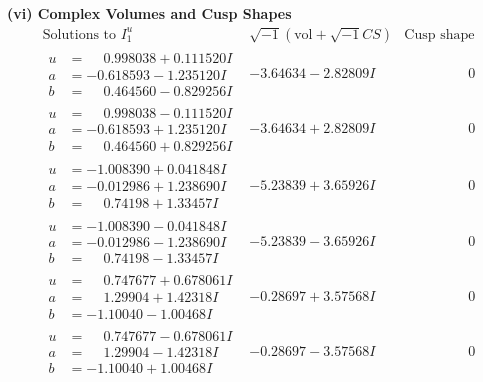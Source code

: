 \documentclass[1p]{elsarticle_modified}
\theoremstyle{definition}
\newcommand{\I}{\sqrt{-1}}
\begin{document}
\newpage\flushleft \textbf{(vi) Complex Volumes and Cusp Shapes}
$$\begin{array}{c|c|c}  
\text{Solutions to }I^u_{1}& \I (\text{vol} + \sqrt{-1}CS) & \text{Cusp shape}\\
 \hline 
\begin{aligned}
u &= \phantom{-}0.998038 + 0.111520 I \\
a &= -0.618593 - 1.235120 I \\
b &= \phantom{-}0.464560 - 0.829256 I\end{aligned}
 & -3.64634 - 2.82809 I & \phantom{-0.000000 } 0 \\ \hline\begin{aligned}
u &= \phantom{-}0.998038 - 0.111520 I \\
a &= -0.618593 + 1.235120 I \\
b &= \phantom{-}0.464560 + 0.829256 I\end{aligned}
 & -3.64634 + 2.82809 I & \phantom{-0.000000 } 0 \\ \hline\begin{aligned}
u &= -1.008390 + 0.041848 I \\
a &= -0.012986 + 1.238690 I \\
b &= \phantom{-}0.74198 + 1.33457 I\end{aligned}
 & -5.23839 + 3.65926 I & \phantom{-0.000000 } 0 \\ \hline\begin{aligned}
u &= -1.008390 - 0.041848 I \\
a &= -0.012986 - 1.238690 I \\
b &= \phantom{-}0.74198 - 1.33457 I\end{aligned}
 & -5.23839 - 3.65926 I & \phantom{-0.000000 } 0 \\ \hline\begin{aligned}
u &= \phantom{-}0.747677 + 0.678061 I \\
a &= \phantom{-}1.29904 + 1.42318 I \\
b &= -1.10040 - 1.00468 I\end{aligned}
 & -0.28697 + 3.57568 I & \phantom{-0.000000 } 0 \\ \hline\begin{aligned}
u &= \phantom{-}0.747677 - 0.678061 I \\
a &= \phantom{-}1.29904 - 1.42318 I \\
b &= -1.10040 + 1.00468 I\end{aligned}
 & -0.28697 - 3.57568 I & \phantom{-0.000000 } 0 \\ \hline\begin{aligned}

\end{aligned}
\end{array}$$
\end{document}
